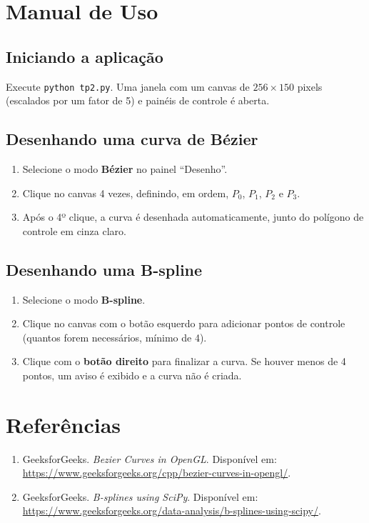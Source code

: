 \documentclass[11pt,a4paper]{article}
\begin{document}
\section{Manual de Uso}

\subsection{Iniciando a aplicação}
Execute \texttt{python tp2.py}. Uma janela com um canvas de
$256 \times 150$ pixels (escalados por um fator de 5) e painéis de controle é
aberta.

\subsection{Desenhando uma curva de Bézier}
\begin{enumerate}
    \item Selecione o modo \textbf{Bézier} no painel “Desenho”.
    \item Clique no canvas 4 vezes, definindo, em ordem, $P_0$, $P_1$, $P_2$ e
    $P_3$.
    \item Após o 4º clique, a curva é desenhada automaticamente, junto do
    polígono de controle em cinza claro.
\end{enumerate}

\subsection{Desenhando uma B-spline}
\begin{enumerate}
    \item Selecione o modo \textbf{B-spline}.
    \item Clique no canvas com o botão esquerdo para adicionar pontos de
    controle (quantos forem necessários, mínimo de 4).
    \item Clique com o \textbf{botão direito} para finalizar a curva. Se
    houver menos de 4 pontos, um aviso é exibido e a curva não é criada.
\end{enumerate}

\section{Referências}

\begin{enumerate}
    \item GeeksforGeeks. \emph{Bezier Curves in OpenGL}. Disponível em:
    \url{https://www.geeksforgeeks.org/cpp/bezier-curves-in-opengl/}.
    \item GeeksforGeeks. \emph{B-splines using SciPy}. Disponível em:
    \url{https://www.geeksforgeeks.org/data-analysis/b-splines-using-scipy/}.
\end{enumerate}
\end{document}
